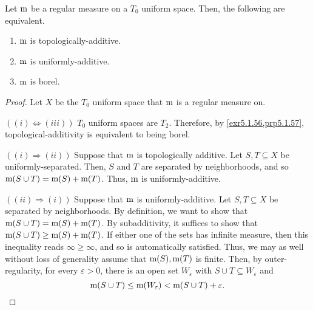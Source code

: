 \begin{prp}\label{prp5.1.61}
Let $\mathrm{m}$ be a regular measure on a $T_0$ uniform space.  Then, the following are equivalent.
\begin{enumerate}
\item $\mathrm{m}$ is topologically-additive.
\item $\mathrm{m}$ is uniformly-additive.
\item $\mathrm{m}$ is borel.
\end{enumerate}
\begin{proof}
Let $X$ be the $T_0$ uniform space that $\mathrm{m}$ is a regular measure on.

\blankline
\noindent
$((i)\Leftrightarrow (iii))$ $T_0$ uniform spaces are $T_2$.  Therefore, by \cref{exr5.1.56,prp5.1.57}, topological-additivity is equivalent to being borel.

\blankline
\noindent
$((i)\Rightarrow (ii))$ Suppose that $\mathrm{m}$ is topologically additive.  Let $S,T\subseteq X$ be uniformly-separated.  Then, $S$ and $T$ are separated by neighborhoods, and so $\mathrm{m} (S\cup T)=\mathrm{m} (S)+\mathrm{m} (T)$.  Thus, $\mathrm{m}$ is uniformly-additive.

\blankline
\noindent
$((ii)\Rightarrow (i))$ Suppose that $\mathrm{m}$ is uniformly-additive.  Let $S,T\subseteq X$  be separated by neighborhoods.  By definition, we want to show that $\mathrm{m} (S\cup T)=\mathrm{m} (S)+\mathrm{m} (T)$.  By subadditivity, it suffices to show that $\mathrm{m} (S\cup T)\geq \mathrm{m} (S)+\mathrm{m} (T)$.  If either one of the sets has infinite measure, then this inequality reads $\infty \geq \infty$, and so is automatically satisfied.  Thus, we may as well without loss of generality assume that $\mathrm{m} (S),\mathrm{m} (T)$ is finite.  Then, by outer-regularity, for every $\varepsilon >0$, there is an open set $W_{\varepsilon}$ with $S\cup T\subseteq W_{\varepsilon}$ and
\begin{equation}
\mathrm{m} (S\cup T)\leq \mathrm{m} (W_{\varepsilon})<\mathrm{m} (S\cup T)+\varepsilon .
\end{equation}


\end{proof}
\end{prp}
